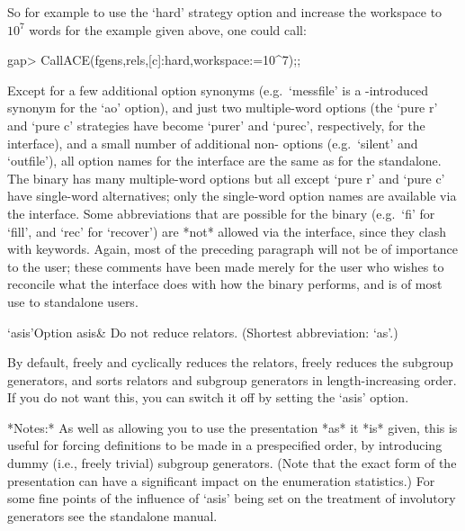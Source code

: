 So  for example to  use the  `hard' strategy  option and  increase the
workspace to $10^7$ words for the example given above, one could call:

\begintt
gap> CallACE(fgens,rels,[c]:hard,workspace:=10^7);;
\endtt

Except for a few additional  option  synonyms  (e.g.~`messfile'  is  a
{\GAP}-introduced synonym for the `ao' {\ACE} option),  and  just  two
multiple-word {\ACE} options (the `pure r'  and  `pure  c'  strategies
have  become  `purer'  and  `purec',  respectively,  for  the   {\GAP}
interface), and  a  small  number  of  additional  non-{\ACE}  options
(e.g.~`silent' and `outfile'), all option names for the interface  are
the same as for the {\ACE} standalone.  The  {\ACE}  binary  has  many
multiple-word options but all  except  `pure  r'  and  `pure  c'  have
single-word  alternatives;  only  the  single-word  option  names  are
available via  the  {\GAP}  interface.  Some  abbreviations  that  are
possible for the {\ACE} binary (e.g.~`fi' for `fill',  and  `rec'  for
`recover') are *not* allowed via  the  {\GAP}  interface,  since  they
clash with {\GAP} keywords. Again, most  of  the  preceding  paragraph
will not be of importance to the {\GAP} user; these comments have been
made merely for the user who wishes to reconcile  what  the  interface
does with how the {\ACE} binary  performs,  and  is  of  most  use  to
standalone users.


\beginitems
\>`asis'{Option asis}&
Do not reduce relators. (Shortest abbreviation: `as'.)

By default, {\ACE} freely  and cyclically reduces the relators, freely
reduces  the  subgroup generators,  and  sorts  relators and  subgroup
generators in length-increasing  order.  If you do not  want this, you
can switch it off by setting the `asis' option.

*Notes:* As well as allowing you  to use the presentation *as* it *is*
given,  this  is  useful for  forcing  definitions  to  be made  in  a
prespecified  order,  by  introducing  dummy  (i.e.,  freely  trivial)
subgroup generators.   (Note that the  exact form of  the presentation
can  have a significant  impact on  the enumeration  statistics.)  For
some fine points of the influence of `asis' being set on the treatment
of involutory generators see the {\ACE} standalone manual.

